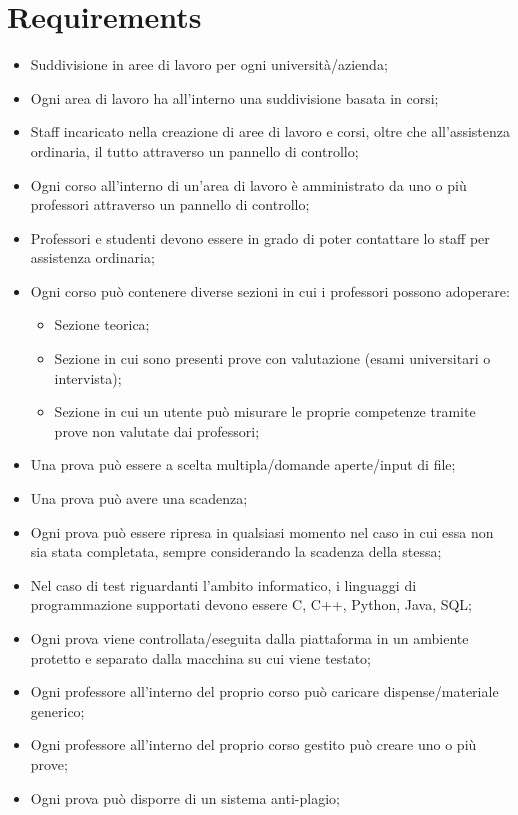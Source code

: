 \documentclass[a4paper,11pt]{report}
\begin{document}
	\section*{Requirements}
	\begin{itemize}
		\item Suddivisione in aree di lavoro per ogni università/azienda;
		\item Ogni area di lavoro ha all'interno una suddivisione basata in corsi;
		\item Staff incaricato nella creazione di aree di lavoro e corsi, oltre che all'assistenza ordinaria, il tutto attraverso un pannello di controllo;
		\item Ogni corso all'interno di un'area di lavoro è amministrato da uno o più professori attraverso un pannello di controllo;
		\item Professori e studenti devono essere in grado di poter contattare lo staff per assistenza ordinaria;
		\item Ogni corso può contenere diverse sezioni in cui i professori possono adoperare:
		\begin{itemize}
			\item Sezione teorica;
			\item Sezione in cui sono presenti prove con valutazione (esami universitari o intervista);
			\item Sezione in cui un utente può misurare le proprie competenze tramite prove non valutate dai professori;
		\end{itemize}
	\item Una prova può essere a scelta multipla/domande aperte/input di file;
	\item Una prova può avere una scadenza;
	\item Ogni prova può essere ripresa in qualsiasi momento nel caso in cui essa non sia stata completata, sempre considerando la scadenza della stessa;
	\item Nel caso di test riguardanti l'ambito informatico, i linguaggi di programmazione supportati devono essere C, C++, Python, Java, SQL;
	\item Ogni prova viene controllata/eseguita dalla piattaforma in un ambiente protetto e separato dalla macchina su cui viene testato;
	\item Ogni professore all'interno del proprio corso può caricare dispense/materiale generico;
	\item Ogni professore all'interno del proprio corso gestito può creare uno o più prove;
	\item Ogni prova può disporre di un sistema anti-plagio;

\end{itemize}
\end{document}
